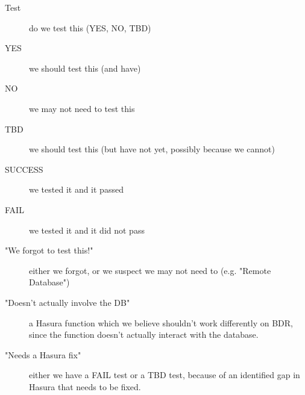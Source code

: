 \documentclass[11pt]{article}
\begin{document}
\begin{description}
\item[{Test}] do we test this (YES, NO, TBD)
\item[{YES}] we should test this (and have)
\item[{NO}] we may not need to test this
\item[{TBD}] we should test this (but have not yet, possibly because we
cannot)
\item[{SUCCESS}] we tested it and it passed
\item[{FAIL}] we tested it and it did not pass
\item[{"We forgot to test this!"}] either we forgot, or we suspect we may
not need to (e.g. "Remote Database")
\item[{"Doesn't actually involve the DB"}] a Hasura function which we
believe shouldn't work differently on BDR, since the function
doesn't actually interact with the database.
\item[{"Needs a Hasura fix"}] either we have a FAIL test or a TBD test,
because of an identified gap in Hasura that needs to be fixed.
\end{description}
\end{document}
